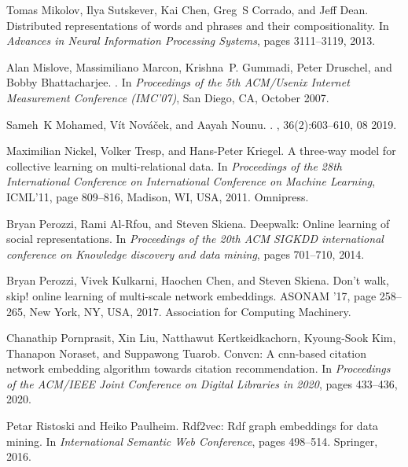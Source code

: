 \documentclass{IEEEtran}
\begin{document}
\begin{thebibliography}{00}
Tomas Mikolov, Ilya Sutskever, Kai Chen, Greg~S Corrado, and Jeff Dean.
\newblock Distributed representations of words and phrases and their
  compositionality.
\newblock In {\em Advances in Neural Information Processing Systems}, pages
  3111--3119, 2013.

Alan Mislove, Massimiliano Marcon, Krishna~P. Gummadi, Peter Druschel, and
  Bobby Bhattacharjee.
.
\newblock In {\em Proceedings of the 5th ACM/Usenix Internet Measurement
  Conference (IMC'07)}, San Diego, CA, October 2007.

Sameh~K Mohamed, Vít Nováček, and Aayah Nounu.
.
, 36(2):603--610, 08 2019.

Maximilian Nickel, Volker Tresp, and Hans-Peter Kriegel.
\newblock A three-way model for collective learning on multi-relational data.
\newblock In {\em Proceedings of the 28th International Conference on
  International Conference on Machine Learning}, ICML'11, page 809–816,
  Madison, WI, USA, 2011. Omnipress.

Bryan Perozzi, Rami Al-Rfou, and Steven Skiena.
\newblock Deepwalk: Online learning of social representations.
\newblock In {\em Proceedings of the 20th ACM SIGKDD international conference
  on Knowledge discovery and data mining}, pages 701--710, 2014.

Bryan Perozzi, Vivek Kulkarni, Haochen Chen, and Steven Skiena.
\newblock Don't walk, skip! online learning of multi-scale network embeddings.
\newblock ASONAM '17, page 258–265, New York, NY, USA, 2017. Association for
  Computing Machinery.

Chanathip Pornprasit, Xin Liu, Natthawut Kertkeidkachorn, Kyoung-Sook Kim,
  Thanapon Noraset, and Suppawong Tuarob.
\newblock Convcn: A cnn-based citation network embedding algorithm towards
  citation recommendation.
\newblock In {\em Proceedings of the ACM/IEEE Joint Conference on Digital
  Libraries in 2020}, pages 433--436, 2020.

Petar Ristoski and Heiko Paulheim.
\newblock Rdf2vec: Rdf graph embeddings for data mining.
\newblock In {\em International Semantic Web Conference}, pages 498--514.
  Springer, 2016.


\end{thebibliography}
\end{document}
